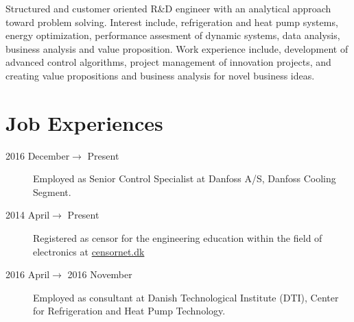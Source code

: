 \documentclass[margin,line,a4paper]{resume}
\begin{document}
\begin{resume}
Structured and customer oriented R\&D engineer with an analytical approach toward problem solving. Interest include, refrigeration and heat pump systems, energy optimization, performance assesment of dynamic systems, data analysis, business analysis and value proposition. Work experience include, development of advanced control algorithms, project management of innovation projects, and creating value propositions and business analysis for novel business ideas.


\section{\mysidestyle Job Experiences}\vspace{1mm}
\begin{description}
\item[2016 December$\rightarrow$ Present] Employed as Senior Control Specialist at Danfoss A/S, Danfoss Cooling Segment.
\item[2014 April$\rightarrow$ Present] Registered as censor for the engineering education within the field of electronics at \href{https://www.censornet.dk/welcome.htm}{censornet.dk}
\item[2016 April$\rightarrow$ 2016 November] Employed as consultant at Danish Technological Institute (DTI), Center for Refrigeration and Heat Pump Technology. %
 

\end{description}
\end{resume}
\end{document}
